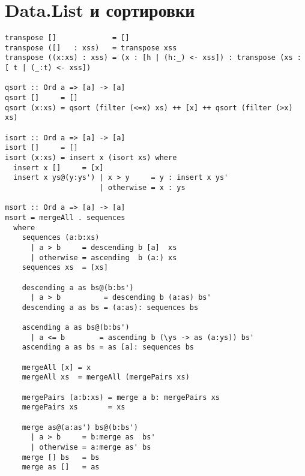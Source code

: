 \documentclass[a4paper,10pt]{article}
\begin{document}
\section{Data.List и сортировки}
\begin{lstlisting}
transpose []             = []
transpose ([]   : xss)   = transpose xss
transpose ((x:xs) : xss) = (x : [h | (h:_) <- xss]) : transpose (xs : [ t | (_:t) <- xss])

qsort :: Ord a => [a] -> [a]
qsort []     = []
qsort (x:xs) = qsort (filter (<=x) xs) ++ [x] ++ qsort (filter (>x) xs)

isort :: Ord a => [a] -> [a]
isort []     = []
isort (x:xs) = insert x (isort xs) where
  insert x []     = [x]
  insert x ys@(y:ys') | x > y     = y : insert x ys'
                      | otherwise = x : ys

msort :: Ord a => [a] -> [a]
msort = mergeAll . sequences
  where
    sequences (a:b:xs)
      | a > b     = descending b [a]  xs
      | otherwise = ascending  b (a:) xs
    sequences xs  = [xs]

    descending a as bs@(b:bs')
      | a > b          = descending b (a:as) bs'
    descending a as bs = (a:as): sequences bs

    ascending a as bs@(b:bs')
      | a <= b        = ascending b (\ys -> as (a:ys)) bs'
    ascending a as bs = as [a]: sequences bs

    mergeAll [x] = x
    mergeAll xs  = mergeAll (mergePairs xs)

    mergePairs (a:b:xs) = merge a b: mergePairs xs
    mergePairs xs       = xs

    merge as@(a:as') bs@(b:bs')
      | a > b     = b:merge as  bs'
      | otherwise = a:merge as' bs
    merge [] bs   = bs
    merge as []   = as
\end{lstlisting}
\end{document}
